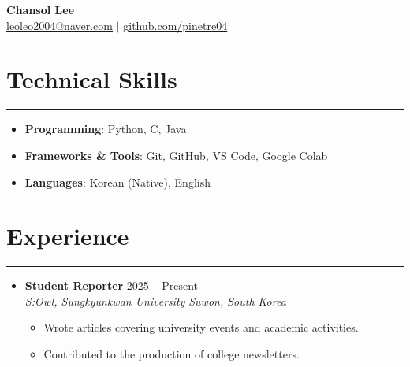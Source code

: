 \documentclass[letterpaper, 10pt]{article}
\begin{document}
\begin{center}
    \textbf{\LARGE Chansol Lee} \\ \vspace{2pt}
    \href{mailto:leoleo2004@naver.com}{\underline{leoleo2004@naver.com}} $|$
    \href{https://github.com/pinetre04}{\underline{github.com/pinetre04}}
\end{center}


\section*{Technical Skills}
\hrule
\vspace{4pt}
\begin{itemize}
    \item[] \textbf{Programming}: Python, C, Java
    \item[] \textbf{Frameworks \& Tools}: Git, GitHub, VS Code, Google Colab
    \item[] \textbf{Languages}: Korean (Native), English
\end{itemize}



\section*{Experience}
\hrule
\vspace{4pt}
\begin{itemize}
    \item[]
        \textbf{Student Reporter} \hfill 2025 -- Present \\
        \textit{S:Owl, Sungkyunkwan University}
        \hfill \textit{Suwon, South Korea}
        \begin{itemize}
            \item Wrote articles covering university events and academic activities.
            \item Contributed to the production of college newsletters.
        \end{itemize}
\end{itemize}


\end{document}
